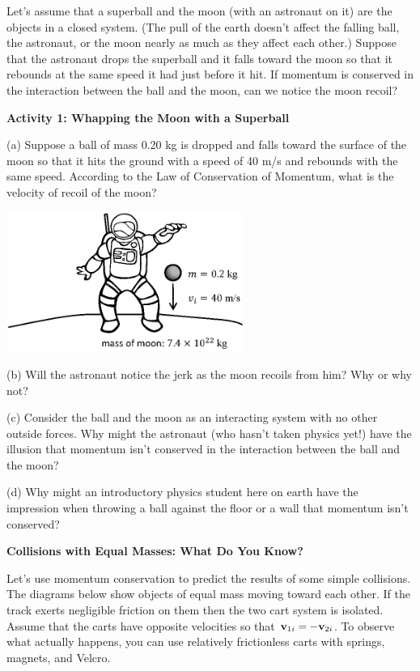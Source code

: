 Let's assume that a superball and the moon (with an astronaut on it) are the
objects in a closed system. (The pull of the earth doesn't affect the falling
ball, the astronaut, or the moon nearly as much as they affect each other.)
Suppose that the astronaut drops the superball and it falls toward the moon
so that it rebounds at the same speed it had just before it hit. If momentum
is conserved in the interaction between the ball and the moon, can we notice
the moon recoil? 

\textbf{Activity 1: Whapping the Moon with a Superball} 

(a) Suppose a ball of mass 0.20 kg is dropped and falls toward the surface of
the moon so that it hits the ground with a speed of 40 m/s and rebounds with
the same speed. According to the Law of Conservation of Momentum, what is the
velocity of recoil of the moon?

{\par\raggedright \includegraphics[height=1.8in]{mom_cons/mom_cons_fig2_new.eps} \par}

\pagebreak[3]

(b) Will the astronaut notice the jerk as the moon recoils from him? Why or
why not?
\answerspace{20mm}

(c) Consider the ball and the moon as an interacting system with no other outside
forces. Why might the astronaut (who hasn't taken physics yet!) have the illusion
that momentum isn't conserved in the interaction between the ball and the moon?
\answerspace{20mm}

(d) Why might an introductory physics student here on earth have the impression
when throwing a ball against the floor or a wall that momentum isn't conserved?
\answerspace{20mm}

\textbf{Collisions with Equal Masses: What Do You Know?} 

Let's use momentum conservation to predict the results of some simple collisions.
The diagrams below show objects of equal mass moving toward each other. If the
track exerts negligible friction on them then the two cart system is isolated.
Assume that the carts have opposite velocities so that \( {{\bf v}_{1i}} 
= - {{\bf v}_{2i}} \). To observe what actually happens, you can
use relatively frictionless carts with springs, magnets, and Velcro.

